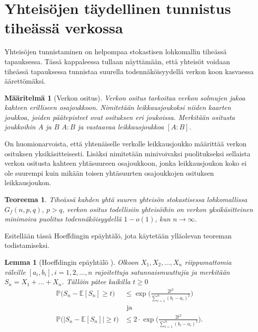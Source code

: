 \documentclass[finnish,12pt,a4paper,pdftex,sci,utf8]{aaltothesis}
\newtheorem{lemma}{Lemma}
\newtheorem{teoreema}{Teoreema}
\newtheorem{definition}{Määritelmä}
\begin{document}
\clearpage

\section{Yhteisöjen täydellinen tunnistus tiheässä verkossa}
Yhteisöjen tunnistaminen on helpompaa stokastisen lohkomallin tiheässä tapauksessa. Tässä kappaleessa tullaan näyttämään, että yhteisöt voidaan tiheässä tapauksessa tunnistaa suurella todennäköisyydellä verkon koon kasvaessa äärettömäksi.

\begin{definition}[Verkon ositus]
	Verkon ositus tarkoitaa verkon solmujen jakoa kahteen erilliseen osajoukkoon. Nimitetään leikkausjoukoksi niiden kaarten joukkoa, joiden päätepisteet ovat osituksen eri joukoissa. Merkitään ositusta joukkoihin $A$ ja $B$ $A:B$ ja vastaavaa leikkausjoukkoa $[A:B]$.
\end{definition}

On huomionarvoista, että yhtenäiselle verkolle leikkausjoukko määrittää verkon osituksen yksikäsitteisesti. Lisäksi nimitetään minivoivaksi puolitukseksi sellaista verkon ositusta kahteen yhtäsuureen osajoukkoon, jonka leikkausjoukon koko ei ole suurempi kuin mikään toisen  yhtäsuurten osajoukkojen osituksen leikkausjoukon.

\begin{teoreema}
	\label{teoreema:mincut}
	Tiheässä kahden yhtä suuren yhteisön stokastisessa lohkomallissa $G_f(n,p,q)$, $p > q$, verkon ositus todellisiin yhteisöihin on verkon yksikäsitteinen minimoiva puolitus todennäköisyydellä $1-o(1)$, kun $n \rightarrow \infty$.
\end{teoreema}

Esitellään tässä Hoeffdingin epäyhtälö, jota käytetään ylläolevan teoreman todistamiseksi.

\begin{lemma}[Hoeffdingin epäyhtälö \cite{Hoeffding}]
	\label{lemma:Hoeffding}
	Olkoon $X_1, X_2, \ldots, X_n$ riippumattomia väleille $[a_i, b_i], i = 1, 2,  \ldots, n$ rajoitettuja satunnaismuuttujia ja merkitään $S_n = X_1 + \ldots + X_n$. Tällöin pätee kaikilla $t \geq 0$
	\begin{align*}
		\mathbb{P} \big( S_n - \mathbb{E}[S_n] \geq t \big) &\leq \exp \big( \frac{2t^2}{\sum_{i=1}^{n} (b_i - a_i)^2} \big) \\
		& \text{ ja } \\
		\mathbb{P}\big(|S_n - \mathbb{E}[S_n]| \geq t \big) &\leq 2 \cdot \exp \big( \frac{2t^2}{\sum_{i=1}^{n} (b_i - a_i)^2} \big).	
	\end{align*}
\end{lemma}
\end{document}
